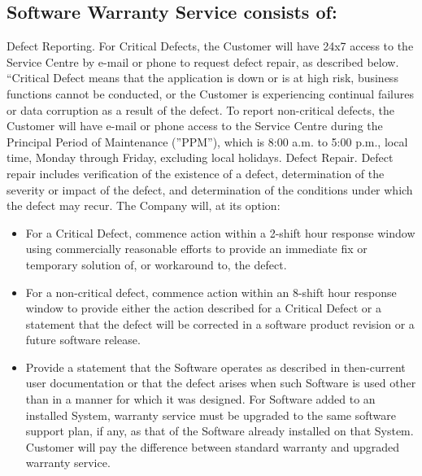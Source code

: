 \subsection{Software Warranty Service consists of:}
Defect Reporting. For Critical Defects, the Customer will have 24x7 access to the Service Centre by e-mail or phone to request defect repair, as described below. “Critical Defect means that the
application is down or is at high risk, business functions cannot be conducted, or the Customer is experiencing continual failures or data corruption as a result of the defect. To report non-critical
defects, the Customer will have e-mail or phone access to the Service Centre during the Principal Period of Maintenance (”PPM”), which is 8:00 a.m. to 5:00 p.m., local time, Monday through Friday,
excluding local holidays. Defect Repair. Defect repair includes verification of the existence of a defect, determination of the
severity or impact of the defect, and determination of the conditions under which the defect may recur. 
The Company will, at its option: 
\begin{itemize}
	\item For a Critical Defect, commence action within a 2-shift hour response window using commercially reasonable efforts to provide an immediate fix or temporary solution of, or workaround
	to, the defect.
	\item For a non-critical defect, commence action within an 8-shift hour response window to provide either the action described for a Critical Defect or a statement that the defect will be corrected
	in a software product revision or a future software release.
	\item Provide a statement that the Software operates as described in then-current user documentation or that the defect arises when such Software is used other than in a manner for which it
	was designed. For Software added to an installed System, warranty service must be upgraded to the same software support plan, if any, as that of the Software already installed on that
	System. Customer will pay the difference between standard warranty and upgraded warranty
	service.
\end{itemize}





